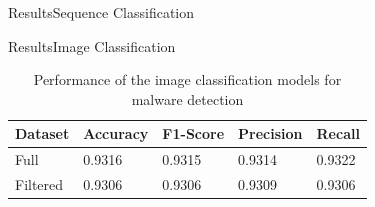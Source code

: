 \documentclass[xcolor={dvipsnames},t,aspectratio=169]{beamer}
\begin{document}
\begin{frame}{Results}{Sequence Classification}

\begin{table}[h]
    \centering
    \caption{Performance of our RoBERTa model for opcode sequence classification and malware detection}
    \label{tab:malberta-base-results}
\end{table}
\end{frame}


\begin{frame}{Results}{Image Classification}

\begin{table}[h]
    \centering
    \caption{Performance of the image classification models for malware detection}
    \begin{tabular}{@{}lllll@{}}
        \toprule
        \textbf{Dataset} & \textbf{Accuracy} & \textbf{F1-Score} & \textbf{Precision} & \textbf{Recall} \\ \midrule
        Full & 0.9316 & 0.9315 & 0.9314 & 0.9322 \\
        Filtered & 0.9306 & 0.9306 & 0.9309 & 0.9306 \\ \bottomrule
    \end{tabular}
    \label{tab:image-classifier-model-results}
\end{table}
\end{frame}
\end{document}
